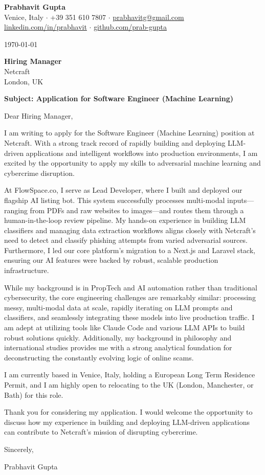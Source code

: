 \documentclass[11pt,a4paper]{article}
\begin{document}
\begin{center}
    {\LARGE \textbf{Prabhavit Gupta}} \\
    Venice, Italy $\cdot$ +39 351 610 7807 $\cdot$ \href{mailto:prabhavitg@gmail.com}{prabhavitg@gmail.com} \\
    \href{https://linkedin.com/in/prabhavit}{linkedin.com/in/prabhavit} $\cdot$ \href{https://github.com/prab-gupta}{github.com/prab-gupta}
\end{center}

\vspace{2em}

\today

\textbf{Hiring Manager} \\
Netcraft \\
London, UK

\textbf{Subject: Application for Software Engineer (Machine Learning)}

Dear Hiring Manager,

I am writing to apply for the Software Engineer (Machine Learning) position at Netcraft. With a strong track record of rapidly building and deploying LLM-driven applications and intelligent workflows into production environments, I am excited by the opportunity to apply my skills to adversarial machine learning and cybercrime disruption.

At FlowSpace.co, I serve as Lead Developer, where I built and deployed our flagship AI listing bot. This system successfully processes multi-modal inputs—ranging from PDFs and raw websites to images—and routes them through a human-in-the-loop review pipeline. My hands-on experience in building LLM classifiers and managing data extraction workflows aligns closely with Netcraft's need to detect and classify phishing attempts from varied adversarial sources. Furthermore, I led our core platform's migration to a Next.js and Laravel stack, ensuring our AI features were backed by robust, scalable production infrastructure.

While my background is in PropTech and AI automation rather than traditional cybersecurity, the core engineering challenges are remarkably similar: processing messy, multi-modal data at scale, rapidly iterating on LLM prompts and classifiers, and seamlessly integrating these models into live production traffic. I am adept at utilizing tools like Claude Code and various LLM APIs to build robust solutions quickly. Additionally, my background in philosophy and international studies provides me with a strong analytical foundation for deconstructing the constantly evolving logic of online scams.

I am currently based in Venice, Italy, holding a European Long Term Residence Permit, and I am highly open to relocating to the UK (London, Manchester, or Bath) for this role.

Thank you for considering my application. I would welcome the opportunity to discuss how my experience in building and deploying LLM-driven applications can contribute to Netcraft's mission of disrupting cybercrime.

Sincerely,

Prabhavit Gupta
\end{document}
